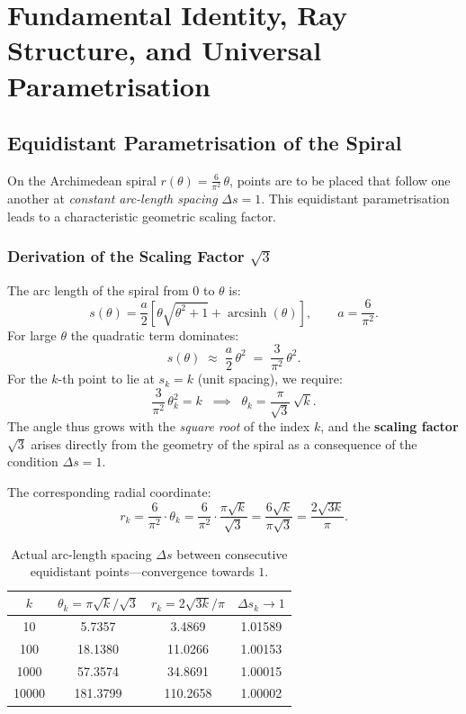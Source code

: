 \chapter{Fundamental Identity, Ray Structure, and Universal Parametrisation}
\label{sec:visualisierung}

\section{Equidistant Parametrisation of the Spiral}

On the Archimedean spiral $r(\theta) = \tfrac{6}{\pi^2}\,\theta$,
points are to be placed that follow one another at \emph{constant
arc-length spacing} $\Delta s = 1$. This equidistant parametrisation
leads to a characteristic geometric scaling factor.

\subsection{Derivation of the Scaling Factor \texorpdfstring{$\sqrt{3}$}{sqrt(3)}}

The arc length of the spiral from $0$ to $\theta$ is:
\[
  s(\theta)
  = \frac{a}{2}\!\left[\theta\sqrt{\theta^2+1}
    + \operatorname{arcsinh}(\theta)\right],
  \qquad a = \frac{6}{\pi^2}.
\]
For large $\theta$ the quadratic term dominates:
\[
  s(\theta) \;\approx\; \frac{a}{2}\,\theta^2
           \;=\; \frac{3}{\pi^2}\,\theta^2.
\]
For the $k$-th point to lie at $s_k = k$ (unit spacing), we require:
\[
  \frac{3}{\pi^2}\,\theta_k^2 = k
  \;\;\implies\;\;
  \theta_k = \frac{\pi}{\sqrt{3}}\,\sqrt{k}.
\]
The angle thus grows with the \emph{square root} of the index $k$, and the
\textbf{scaling factor $\sqrt{3}$} arises directly from the
geometry of the spiral as a consequence of the condition $\Delta s = 1$.

The corresponding radial coordinate:
\[
  r_k
  = \frac{6}{\pi^2}\cdot\theta_k
  = \frac{6}{\pi^2}\cdot\frac{\pi\sqrt{k}}{\sqrt{3}}
  = \frac{6\sqrt{k}}{\pi\sqrt{3}}
  = \frac{2\sqrt{3k}}{\pi}.
\]

\begin{table}[H]
\centering
\renewcommand{\arraystretch}{1.2}
\caption{Actual arc-length spacing $\Delta s$ between
  consecutive equidistant points---convergence towards $1$.}
\begin{tabular}{cccc}
\toprule
$k$ & $\theta_k = \pi\sqrt{k}/\sqrt{3}$ & $r_k = 2\sqrt{3k}/\pi$ & $\Delta s_k \to 1$ \\
\midrule
   10 &   5.7357 &   3.4869 & 1.01589 \\
  100 &  18.1380 &  11.0266 & 1.00153 \\
 1000 &  57.3574 &  34.8691 & 1.00015 \\
10000 & 181.3799 & 110.2658 & 1.00002 \\
\bottomrule
\end{tabular}
\end{table}

